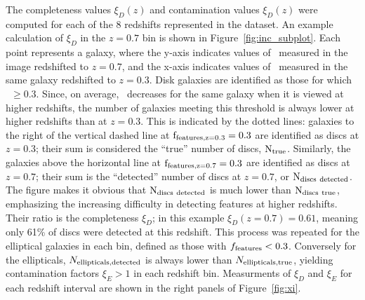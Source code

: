 \documentclass[useAMS,usenatbib]{mn2e}
\begin{document}
The completeness values $\xi_D(z)$ and contamination values $\xi_D(z)$ were computed for each of the 8 redshifts represented in the  dataset. An example calculation of $\xi_D$ in the $z=0.7$ bin is shown in Figure~\ref{fig:inc_subplot}. Each point represents a  galaxy, where the y-axis indicates values of \ffeatures~measured in the image redshifted to $z=0.7$, and the x-axis indicates values of \ffeatures~measured in the same galaxy redshifted to $z=0.3$. Disk galaxies are identified as those for which \ffeatures~$\ge0.3$. Since, on average, \ffeatures~decreases for the same galaxy when it is viewed at higher redshifts, the number of galaxies meeting this threshold is always lower at higher redshifts than at $z=0.3$. This is indicated by the dotted lines: galaxies to the right of the vertical dashed line at $\rm f_{features,z=0.3}=0.3$ are identified as discs at $z=0.3$; their sum is considered the ``true'' number of discs, $\rm N_{true}$. Similarly, the galaxies above the horizontal line at $\rm f_{features,z=0.7}=0.3$ are identified as discs at $z=0.7$; their sum is the ``detected'' number of discs at $z=0.7$, or $\rm N_{discs~detected}$. The figure makes it obvious that $\rm N_{discs~detected}$ is much lower than $\rm N_{discs~true}$, emphasizing the increasing difficulty in detecting features at higher redshifts. Their ratio is the completeness $\xi_D$; in this example $\xi_D(z=0.7)=0.61$, meaning only 61\% of discs were detected at this redshift. This process was repeated for the elliptical galaxies in each bin, defined as those with $f_{\rm features}<0.3$. Conversely for the ellipticals, $N_{\rm ellipticals, detected}$ is always lower than $N_{\rm ellipticals, true}$, yielding contamination factors $\xi_E>1$ in each redshift bin. Measurments of $\xi_D$ and $\xi_E$ for each redshift interval are shown in the right panels of Figure~\ref{fig:xi}.
\end{document}
